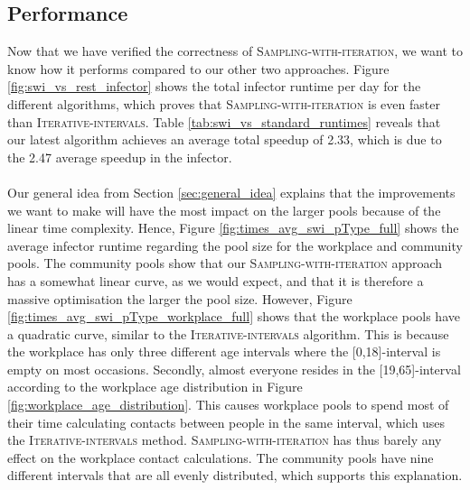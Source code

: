 \subsection{Performance}
\label{subsec:performance_sampling_with_iteration}
Now that we have verified the correctness of \textsc{Sampling-with-iteration}, we want to know how it performs compared to our other two approaches. Figure \ref{fig:swi_vs_rest_infector} shows the total infector runtime per day for the different algorithms, which proves that \textsc{Sampling-with-iteration} is even faster than \textsc{Iterative-intervals}. Table \ref{tab:swi_vs_standard_runtimes} reveals that our latest algorithm achieves an average total speedup of 2.33, which is due to the 2.47 average speedup in the infector.
\\\\
Our general idea from Section \ref{sec:general_idea} explains that the improvements we want to make will have the most impact on the larger pools because of the linear time complexity. Hence, Figure \ref{fig:times_avg_swi_pType_full} shows the average infector runtime regarding the pool size for the workplace and community pools. The community pools show that our \textsc{Sampling-with-iteration} approach has a somewhat linear curve, as we would expect, and that it is therefore a massive optimisation the larger the pool size. However, Figure \ref{fig:times_avg_swi_pType_workplace_full} shows that the workplace pools have a quadratic curve, similar to the \textsc{Iterative-intervals} algorithm. This is because the workplace has only three different age intervals where the [0,18]-interval is empty on most occasions. Secondly, almost everyone resides in the [19,65]-interval according to the workplace age distribution in Figure \ref{fig:workplace_age_distribution}. This causes workplace pools to spend most of their time calculating contacts between people in the same interval, which uses the \textsc{Iterative-intervals} method. \textsc{Sampling-with-iteration} has thus barely any effect on the workplace contact calculations. The community pools have nine different intervals that are all evenly distributed, which supports this explanation.
\\\\
